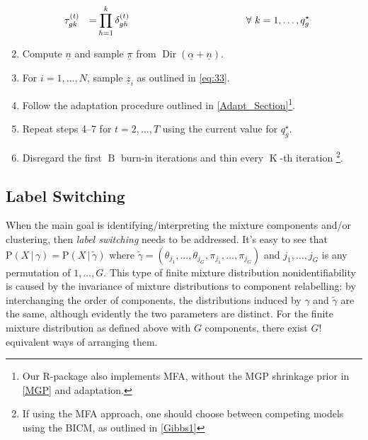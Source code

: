 \documentclass[a4paper,12pt,fleqn]{article}
\numberwithin{equation}{section}
\def\given{\,|\,}
\begin{document}
\begin{enumerate}[label*=\arabic*.]
\begin{alignat*}{4}
		&\tau_{gk}^{\left(t\right)} &=& \prod_{h=1}^{k}\delta_{gh}^{\left(t\right)}\quad\hspace{38mm}\forall~k=1,\ldots,q_g^\star\nonumber
		\end{alignat*}
	\item Compute $\underline{n}$ and sample $\underline{\pi}$ from $\operatorname{Dir}\left(\underline{\alpha} + \underline{n}\right)$.
	\item For $i=1,\ldots,N$, sample $\underline{z}_i$ as outlined in \eqref{eq:33}.
	\item Follow the adaptation procedure outlined in \ref{Adapt_Section}\footnote{Our R-package also implements MFA, without the MGP shrinkage prior in \ref{MGP} and adaptation.}.
	\item Repeat steps 4--7 for $t=2,\ldots,T$ using the current value for $q_g^\star$.
	\item Disregard the first $\operatorname{B}$ burn-in iterations and thin every $\operatorname{K}$-th iteration \footnote{If using the MFA approach, one should choose between competing models using the BICM, as outlined in \ref{Gibbs1}}.
\end{enumerate}
\subsection[Label Switching]{Label Switching}
When the main goal is identifying/interpreting the mixture components and/or clustering, then \textit{label switching} needs to be addressed. It's easy to see that $\mathrm{P}\left(X\given\gamma\right) = \mathrm{P}\left(X\given\tilde\gamma\right)$ where $\tilde\gamma = \left(\theta_{j_1},\ldots,\theta_{j_G},\pi_{j_1},\ldots,\pi_{j_G}\right)$ and $j_1,\ldots,j_G$ is any permutation of $1,\ldots,G$. This type of finite mixture distribution nonidentifiability is caused by the invariance of mixture distributions to component relabelling: by interchanging the order of components, the distributions induced by $\gamma$ and $\tilde{\gamma}$ are the same, although evidently the two parameters are distinct. For the finite mixture distribution as defined above with $G$ components, there exist $G!$ equivalent ways of arranging them.

\end{document}
